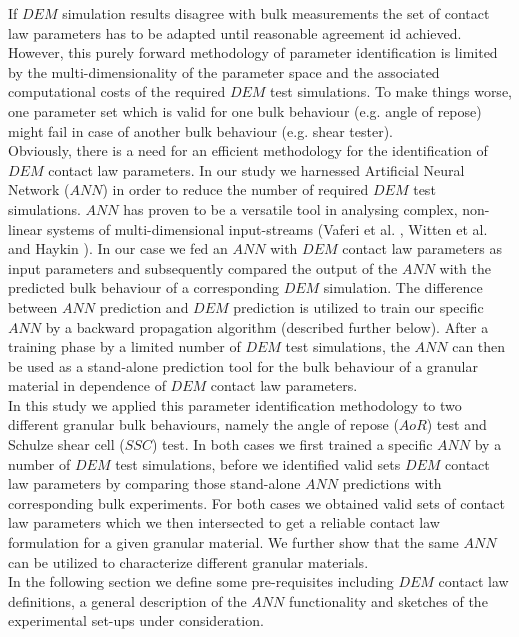 \documentclass[review]{elsarticle}
\begin{document}
If $DEM$ simulation results disagree with bulk measurements the set of contact law parameters 
has to be adapted until reasonable agreement id achieved.\\
However, this purely forward methodology of parameter identification is limited by 
the multi-dimensionality of the parameter space and the associated computational costs of the required $DEM$ test simulations. 
To make things worse, one parameter set which is valid for one bulk behaviour (e.g. angle of repose) 
might fail in case of another bulk behaviour (e.g. shear tester). \\
Obviously, there is a need for an efficient methodology for the identification of $DEM$ contact law parameters. 
In our study we harnessed Artificial Neural Network ($ANN$) in order to reduce the number of required $DEM$ test simulations. 
$ANN$ has proven to be a versatile tool in analysing complex, non-linear systems of 
multi-dimensional input-streams (Vaferi et al. \cite{RefWorks:150}, Witten et
al. \cite{RefWorks:174} and Haykin \cite{RefWorks:158}).
In our case we fed an $ANN$ with $DEM$ contact law parameters as input parameters and 
subsequently compared the output of the $ANN$ with the predicted bulk behaviour of a corresponding $DEM$ simulation. 
The difference between $ANN$ prediction and $DEM$ prediction is utilized to train our 
specific $ANN$ by a backward propagation algorithm (described further below). 
After a training phase by a limited number of $DEM$ test simulations, the $ANN$ can then be 
used as a stand-alone prediction tool for the bulk behaviour of a granular material in dependence of $DEM$ contact law parameters. \\
In this study we applied this parameter identification methodology to two different granular bulk behaviours, 
namely the angle of repose ($AoR$) test and Schulze shear cell ($SSC$) test. 
In both cases we first trained a specific $ANN$ by a number of $DEM$ test simulations, 
before we identified valid sets $DEM$ contact law parameters by comparing those 
stand-alone $ANN$ predictions with corresponding bulk experiments. 
For both cases we obtained valid sets of contact law parameters 
which we then intersected to get a reliable contact law formulation for a given granular material. 
We further show that the same $ANN$ can be utilized to characterize different granular materials. \\
In the following section we define some pre-requisites including $DEM$ contact law definitions, 
a general description of the $ANN$ functionality and sketches of the experimental set-ups under consideration. 
\end{document}
